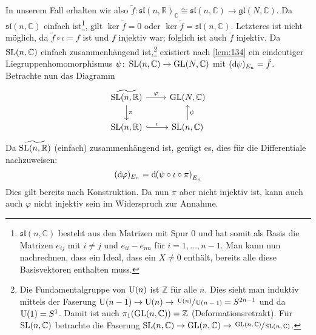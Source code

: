 \begin{beweis}
	In unserem Fall erhalten wir also $\tilde{f} \colon \mathfrak{sl}(n,\mathbb{R})_{\mathbb{C}} \cong \mathfrak{sl}(n,\mathbb{C}) \to \mathfrak{gl}(N,\mathbb{C})$.
	Da $\mathfrak{sl}(n,\mathbb{C})$ einfach ist\footnote{$\mathfrak{sl}(n,\mathbb{C})$ besteht aus den Matrizen mit Spur $0$ und hat somit als Basis die Matrizen $e_{ij}$ mit $i\neq j$ und $e_{ii} - e_{nn}$ für $i=1,\ldots ,n-1$. Man kann nun nachrechnen, dass ein Ideal, dass ein $X\neq 0$ enthält, bereits alle diese Basisvektoren enthalten muss.}, gilt $\ker \tilde{f}=0$ oder $\ker \tilde{f} = \mathfrak{sl}(n,\mathbb{C})$.
	Letzteres ist nicht möglich, da $\tilde{f} \circ \iota = f$ ist und  $f$ injektiv war; folglich ist auch $\tilde{f}$ injektiv.
	Da $\operatorname{SL}(n,\mathbb{C})$ einfach zusammenhängend ist,\footnote{Die Fundamentalgruppe von $\operatorname{U}(n)$ ist $\mathbb{Z}$ für alle $n$. Dies sieht man induktiv mittels der Faserung $\operatorname{U}(n-1) \to \operatorname{U}(n) \to \sfrac{\operatorname{U}(n)}{\operatorname{U}(n-1)} = S^{2n-1}$ und da $\operatorname{U}(1)=S^1$. Damit ist auch $\pi_1(\operatorname{GL}(n,\mathbb{C}))=\mathbb{Z}$ (Deformationsretrakt). Für $\operatorname{SL}(n,\mathbb{C})$ betrachte die Faserung $\operatorname{SL}(n,\mathbb{C}) \to \operatorname{GL}(n,\mathbb{C}) \to \sfrac{\operatorname{GL}(n,\mathbb{C})}{\operatorname{SL}(n,\mathbb{C})}$.} existiert nach \autoref{lem:134} ein eindeutiger Liegruppenhomomorphismus $\psi \colon \operatorname{SL}(n,\mathbb{C}) \to \operatorname{GL}(N,\mathbb{C})$ mit $(\mathrm{d}\mkern-1.0mu \psi)_{E_n} = \tilde{f}$.
	Betrachte nun das Diagramm
	\[
		\begin{tikzcd}
			\widetilde{\SL(n,\mathbb{R})} \rar["\varphi"] \dar["\pi"] & \GL(N,\mathbb{C}) \\
			\SL(n,\mathbb{R}) \rar[hook,"\iota"] & \SL(n,\mathbb{C}) \uar["\psi"']
		\end{tikzcd}
	\]
	Da $\widetilde{\operatorname{SL}(n,\mathbb{R})}$ (einfach) zusammenhängend ist, genügt es, dies für die Differentiale nachzuweisen:
	\[
		(\mathd \varphi)_{E_n} = \mathd \enbrace*{\psi \circ \iota \circ \pi}_{E_n}
	\]
	Dies gilt bereits nach Konstruktion.
	Da nun $\pi$ aber nicht injektiv ist, kann auch auch $\varphi$ nicht injektiv sein im Widerspruch zur Annahme.
\end{beweis}












